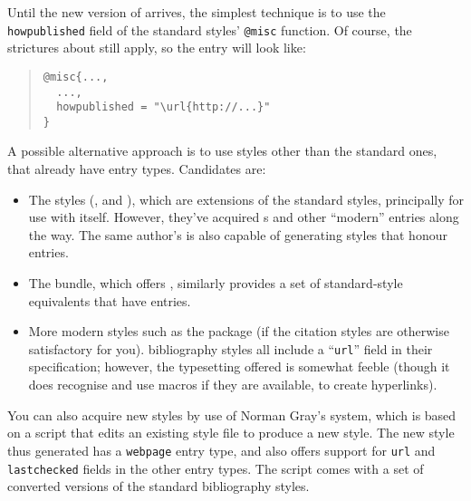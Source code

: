 Until the new version of \BibTeX{} arrives, the simplest technique is
to use the \texttt{howpublished} field of the standard styles' \texttt{@misc}
function.  Of course, the strictures
about  still apply, so the
entry will look like:
\begin{quote}
\begin{verbatim}
@misc{...,
  ...,
  howpublished = "\url{http://...}"
}
\end{verbatim}
\end{quote}
A possible alternative approach is to use \BibTeX{} styles other than
the standard ones, that already have  entry types.
Candidates are:
\begin{itemize}
\item The  styles (,
   and ), which are extensions of
  the standard styles, principally for use with 
  itself.  However, they've acquired s and other ``modern''
  entries along the way.  The same author's  is
  also capable of generating styles that honour  entries.
\item The  bundle, which offers %
  , similarly provides a
  set of standard-style equivalents that have  entries.
\item More modern styles such as the  package (if the
  citation styles are otherwise satisfactory for you).
   bibliography styles all include a ``\texttt{url}''
  field in their specification; however, the typesetting offered is
  somewhat feeble (though it does recognise and use
   macros if they are available, to create
  hyperlinks).
\end{itemize}
You can also acquire new \BibTeX{} styles by use of Norman Gray's
 system, which is based on a  script
that edits an existing \BibTeX{} style file to produce a new
style. The new style thus generated has a \texttt{webpage} entry type, and
also offers support for \texttt{url} and \texttt{lastchecked} fields
in the other entry types.  The  script comes with a set
of converted versions of the standard bibliography styles.


